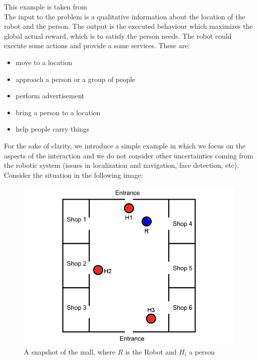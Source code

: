 \documentclass[pdftex,12pt,a4paper]{report}
\begin{document}
This example is taken from \cite{iocchi2016practical} \\ %
The input to the problem is a qualitative information about the location of the robot and the person. 
The output is the executed behaviour which maximizes the global actual reward, which is to satisfy the person needs.
The robot could execute some actions and provide a some services. These are: 
\begin{itemize}
\item move to a location
\item approach a person or a group of people
\item perform advertisement
\item bring a person to a location
\item help people carry things
\end{itemize}
For the sake of clarity, we introduce a simple example in which we focus on the aspects of the interaction and we do not consider other uncertainties coming from the robotic system (issues in localization and navigation, face detection, etc). 
Consider the situation in the following image:
\begin{figure}[H]
	\centering
	\includegraphics[scale=0.5]{images/mall_situation1.png}
	\caption{A snapshot of the mall, where $R$ is the Robot and $H_i$ a person}
	\label{fig:mall_1}
\end{figure}
\end{document}
